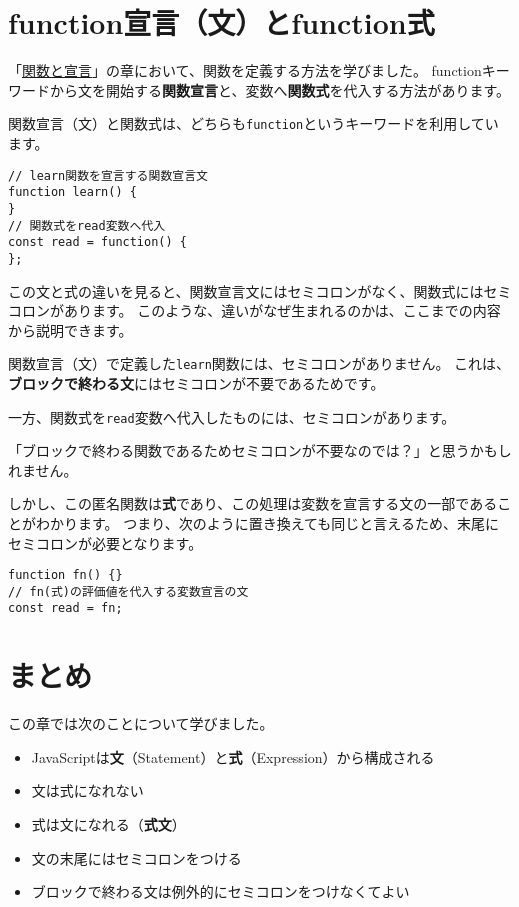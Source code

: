 \hypertarget{function-statement-and-function-expression}{%
\section{function宣言（文）とfunction式}\label{function-statement-and-function-expression}}

「\href{../function-declaration/README.md}{関数と宣言}」の章において、関数を定義する方法を学びました。
functionキーワードから文を開始する\textbf{関数宣言}と、変数へ\textbf{関数式}を代入する方法があります。

関数宣言（文）と関数式は、どちらも\texttt{function}というキーワードを利用しています。

\begin{lstlisting}
// learn関数を宣言する関数宣言文
function learn() {
}
// 関数式をread変数へ代入
const read = function() {
};
\end{lstlisting}

この文と式の違いを見ると、関数宣言文にはセミコロンがなく、関数式にはセミコロンがあります。
このような、違いがなぜ生まれるのかは、ここまでの内容から説明できます。

関数宣言（文）で定義した\texttt{learn}関数には、セミコロンがありません。
これは、\textbf{ブロックで終わる文}にはセミコロンが不要であるためです。

一方、関数式を\texttt{read}変数へ代入したものには、セミコロンがあります。

「ブロックで終わる関数であるためセミコロンが不要なのでは？」と思うかもしれません。

しかし、この匿名関数は\textbf{式}であり、この処理は変数を宣言する文の一部であることがわかります。
つまり、次のように置き換えても同じと言えるため、末尾にセミコロンが必要となります。

\begin{lstlisting}
function fn() {}
// fn(式)の評価値を代入する変数宣言の文
const read = fn;
\end{lstlisting}

\hypertarget{statement-expression-summary}{%
\section{まとめ}\label{statement-expression-summary}}

この章では次のことについて学びました。

\begin{itemize}
\item
  JavaScriptは\textbf{文}（Statement）と\textbf{式}（Expression）から構成される
\item
  文は式になれない
\item
  式は文になれる（\textbf{式文}）
\item
  文の末尾にはセミコロンをつける
\item
  ブロックで終わる文は例外的にセミコロンをつけなくてよい
\end{itemize}

